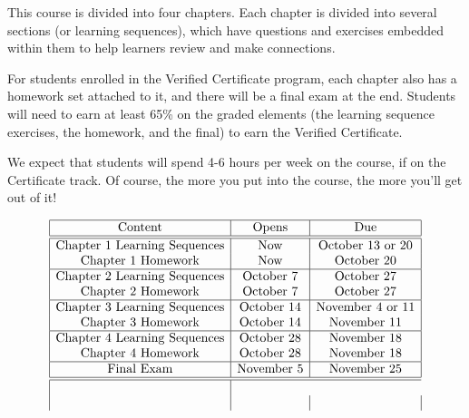 \endedxtext

\endedxvertical







This course is divided into four chapters.  Each chapter is divided into several sections (or learning sequences), which have questions and 
exercises embedded within them to help learners review and make connections.  

For students enrolled in the Verified Certificate program, each chapter also has a homework set attached to it, and there will be a final exam at the end.  Students will need to earn at least 65\% on the graded elements (the learning sequence exercises, the homework, and the final) to earn the
Verified Certificate.  

We expect that students will spend 4-6 hours per week on the course, if on the Certificate track.  Of course, the more
you put into the course, the more you'll get out of it!  




\[
\begin{array}{|c|c|c|}
\hline
\mathrm{Content} & \mathrm{Opens} & \mathrm{Due} \\
\hline \hline
\mathrm{Chapter\ 1\ Learning\ Sequences} & \mathrm{Now} &  \mathrm{October \ 13 \ or \ 20}  \\
\mathrm{Chapter\ 1\ Homework} & \mathrm{Now} &  \mathrm{October \  20} \\
\hline
\mathrm{Chapter\ 2\ Learning\ Sequences} & \mathrm{October \ 7}  &   \mathrm{October \ 27}   \\
\mathrm{Chapter\ 2\ Homework} & \mathrm{October \ 7} &  \mathrm{October \ 27} \\
\hline
\mathrm{Chapter\ 3\ Learning\ Sequences} & \mathrm{October \ 14} &   \mathrm{November \  4 \ or \ 11}   \\
\mathrm{Chapter\ 3\ Homework} & \mathrm{October \ 14} & \mathrm{November \ 11}  \\
\hline
\mathrm{Chapter\ 4\ Learning\ Sequences} & \mathrm{October \ 28} & \mathrm{November \ 18}   \\
\mathrm{Chapter\ 4\ Homework} & \mathrm{October \ 28} & \mathrm{November \ 18} \\
\hline
\mathrm{Final\ Exam} & \mathrm{November  \ 5} & \mathrm{November  \ 25}  \\
\hline \hline \\
 & & 
\end{array}
\]
 
